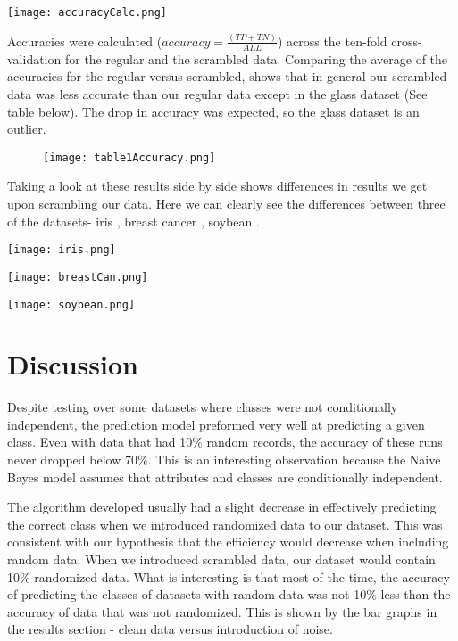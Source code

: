 \documentclass[twoside,11pt]{article}
\begin{document}
\begin{center}
\texttt{[image: accuracyCalc.png]}
\end{center}

\noindent
Accuracies were calculated ($accuracy = \frac{(TP+TN)}{ALL}$) across the ten-fold cross-validation for the regular and the scrambled data. Comparing the average of the accuracies for the regular versus scrambled, shows that in general our scrambled data was less accurate than our regular data except in the glass dataset (See table below). The drop in accuracy was expected, so the glass dataset is an outlier. 

\begin{figure}[htp]
    \centering
    \texttt{[image: table1Accuracy.png]}
\end{figure}

Taking a look at these results side by side shows differences in results we get upon scrambling our data. Here we can clearly see the differences between three of the datasets- iris \citep{fis88}, breast cancer \citep{wol87}, soybean \citep{mic87}.


\begin{center}
\texttt{[image: iris.png]}
\end{center}

\begin{center}
\texttt{[image: breastCan.png]}
\end{center}

\begin{center}
\texttt{[image: soybean.png]}
\end{center}





\section{Discussion}

Despite testing over some datasets where classes were not conditionally independent, the prediction model preformed very well at predicting a given class. Even with data that had 10\% random records, the accuracy of these runs never dropped below 70\%. This is an interesting observation because the Naive Bayes model assumes that attributes and classes are conditionally independent.

The algorithm developed usually had a slight decrease in effectively predicting the correct class when we introduced randomized data to our dataset. This was consistent with our hypothesis that the efficiency would decrease when including random data. When we introduced scrambled data, our dataset would contain 10\% randomized data. What is interesting is that most of the time, the accuracy of predicting the classes of datasets with random data was not 10\% less than the accuracy of data that was not randomized. This is shown by the bar graphs in the results section - clean data versus introduction of noise. 
\end{document}

